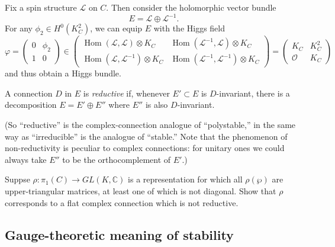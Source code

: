 \documentclass[12pt,letterpaper,reqno]{article}
\numberwithin{equation}{section}
\newcommand{\cL}{\ensuremath{\mathcal L}}
\newcommand{\cO}{\ensuremath{\mathcal O}}
\newcommand{\C}{\ensuremath{\mathbb C}}
\newcommand{\ti}[1]{\textit{#1}}
\DeclareMathOperator{\Hom}{Hom}
\begin{document}
\begin{example} \label{exa:hitchin-section-SL2}
Fix a spin structure
$\cL$ on $C$.
Then consider the holomorphic vector
bundle
\begin{equation}
  E = \cL \oplus \cL^{-1}.
\end{equation}
For any $\phi_2 \in H^0(K_C^2)$,
we can equip $E$ with the Higgs field
\begin{equation}
  \varphi = \begin{pmatrix} 0 & \phi_2 \\ 1 & 0 \end{pmatrix} \in \begin{pmatrix} \Hom(\cL,\cL) \otimes K_C & \Hom(\cL^{-1},\cL) \otimes K_C \\ \Hom(\cL,\cL^{-1}) \otimes K_C & \Hom(\cL^{-1},\cL^{-1}) \otimes K_C \end{pmatrix} = \begin{pmatrix} K_C & K_C^2 \\ \cO & K_C \end{pmatrix}
\end{equation}
and thus obtain a Higgs bundle.
\end{example}



\begin{defn} A connection $D$ in $E$
is \ti{reductive} if, whenever $E' \subset E$ is $D$-invariant,
there is a decomposition $E = E' \oplus E''$ where $E''$ is
also $D$-invariant.
\end{defn}

(So ``reductive'' is the complex-connection analogue of ``polystable,''
in the same way as ``irreducible'' is the analogue of ``stable.''
Note that the phenomenon of non-reductivity
is peculiar to complex connections: for
unitary ones we could always take $E''$ to be the orthocomplement
of $E'$.)

\begin{exercise}
Suppse $\rho: \pi_1(C) \to GL(K,\C)$ is a representation for which all
$\rho(\wp)$ are upper-triangular matrices, at least one
of which is not diagonal.
Show that $\rho$ corresponds to a flat complex connection
which is not reductive.
\end{exercise}

\subsection{Gauge-theoretic meaning of stability}
\end{document}
